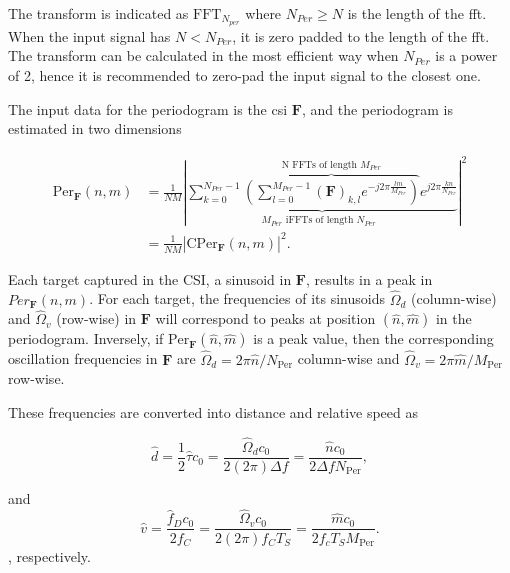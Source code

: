     
    The transform is indicated as $\text{FFT}_{N_{per}}$ where $N_{Per} \geq N$ is the length of the \gls{fft}. When the input signal has $N < N_{Per}$, it is zero padded to the length of the \gls{fft}.
    The transform can be calculated in the most efficient way when $N_{Per}$ is a power of 2, hence it is recommended to zero-pad the input signal to the closest one.

    The input data for the periodogram is the \gls{csi} $\mathbf F$, and the periodogram is estimated in two dimensions

    \begin{equation}
    	\label{eq:periodogram_full}
    	\begin{aligned}
    		\text{Per}_{\mathbf F}(n,m) &= \frac{1}{NM} \left| \underbrace{ \sum_{k=0}^{N_{Per}-1}  \overbrace{\left(  \sum_{l=0}^{M_{Per}-1} (\mathbf F)_{k,l} e^{-j2\pi \frac{lm}{M_{Per}}} \right)}^{\text{N FFTs of length $M_{Per}$}}  e^{j2\pi\frac{kn}{N_{Per}}}}_{ \text{$M_{Per}$ iFFTs of length $N_{Per}$ }} \right| ^ 2 \\
    		&= \frac{1}{NM} \left| \text{CPer}_{\mathbf F}(n,m) \right| ^ 2.
    	\end{aligned}
    \end{equation}


    Each target captured in the CSI, \ie a sinusoid in $\mathbf F$, results in a peak in $Per_{\mathbf F}(n,m)$.
    For each target, the frequencies of its sinusoids $\hat{\Omega}_d$ (column-wise) and $\hat{\Omega}_v$ (row-wise) in $\mathbf F$ will correspond to peaks at position $(\hat{n}, \hat{m})$ in the periodogram. Inversely, if $\text{Per}_{\bm{F}}(\hat{n},\hat{m})$ is a peak value, then the corresponding oscillation frequencies in $\mathbf F$ are $\hat{\Omega}_d = 2\pi\hat{n}/N_{\text{Per}}$ column-wise and $\hat{\Omega}_v = 2\pi\hat{m}/M_{\text{Per}}$ row-wise.
    
    These frequencies are converted into distance and relative speed as

    \begin{equation}
        \hat{d} = \frac{1}{2}\hat{\tau}c_0 = \frac{\hat{\Omega}_d c_0}{2 (2\pi) \Delta f} = \frac{\hat{n}c_0}{2\Delta f N_\text{Per}}, 
    \end{equation}
    
    and
    \begin{equation}
    	\hat{v} = \frac{\hat{f}_D c_0 }{2 f_C} = \frac{\hat{\Omega}_v c_0}{2(2\pi)f_CT_S} =  \frac{\hat{m}c_0}{2f_cT_S M_{\text{Per}}}.
    \end{equation},
    respectively.
    
